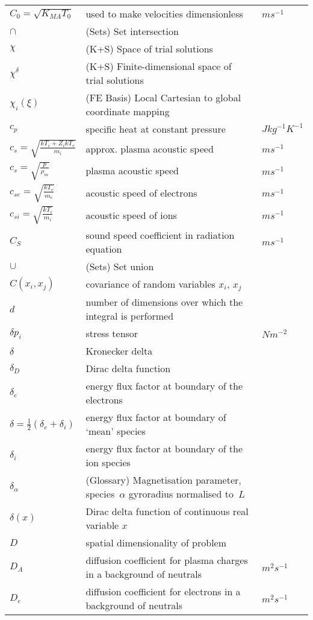 \begin{longtable}{|p{3.0cm}|p{10.0cm}|p{3.0cm}|}
$C_0=\sqrt{K_{MA} T_0}$ & used to make velocities dimensionless  &  $m s^{-1}$ \\
$\cap$ &  (Sets) Set intersection & \\
$\chi$ &  (K+S) Space of trial solutions & \\
$\chi^{\delta}$ &  (K+S) Finite-dimensional space of trial solutions & \\
$\chi_i(\xi)$ &  (FE Basis) Local Cartesian to global coordinate mapping & \\
$c_p$ & specific heat at constant pressure  &  $J kg^{-1} K^{-1}$ \\
$c_s = \sqrt{\frac{kT_i + {Z_i} kT_e}{{m_i}}}$ & approx. plasma acoustic speed  &  $m s^{-1}$ \\
$c_s = \sqrt{\frac{p}{\rho_m}}$ & plasma acoustic speed  &  $m s^{-1}$ \\
$c_{se} = \sqrt{\frac{kT_e}{{m_e}}}$ & acoustic speed of electrons  &  $m s^{-1}$ \\
$c_{si} = \sqrt{\frac{kT_i}{{m_i}}}$ & acoustic speed of ions  &  $m s^{-1}$ \\
$C_S$ & sound speed coefficient in radiation equation  &  $m s^{-1}$ \\
$\cup$ &  (Sets) Set union & \\
$C(x_i, x_j)$ & covariance of random variables $x_i$, $x_j$  & \\
$d$ & number of dimensions over which the integral is performed  & \\
$\delta p_i$ & stress tensor  & $N m^{-2}$ \\
$\delta$ & Kronecker delta & \\
$\delta_D$ & Dirac delta function & \\
$\delta_e$ & energy flux factor at boundary of the electrons  & \\
$\delta=\frac{1}{2}(\delta_e+\delta_i)$ & energy flux factor at boundary of `mean' species  & \\
$\delta_i$ & energy flux factor at boundary of the ion species  & \\
$\delta_\alpha$ & (Glossary) Magnetisation  parameter, species~$\alpha$  gyroradius normalised to~$L$ & \\
$\delta(x)$ & Dirac delta function of continuous real variable $x$  & \\
$D$ & spatial dimensionality of problem &   \\
$D_A$ & diffusion coefficient for plasma charges in a background of neutrals  &  $m^2 s^{-1}$ \\
$D_e$ & diffusion coefficient for electrons in a background of neutrals  &  $m^2 s^{-1}$ \\

\end{longtable}
